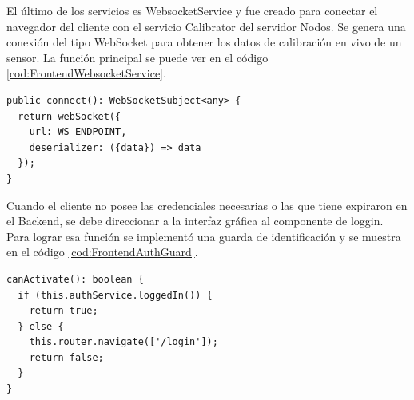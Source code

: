 El último de los servicios es WebsocketService y fue creado para conectar el navegador del cliente con el servicio Calibrator del servidor Nodos.
Se genera una conexión del tipo WebSocket para obtener los datos de calibración en vivo de un sensor.
La función principal se puede ver en el código \ref{cod:FrontendWebsocketService}.

\begin{lstlisting}[label=cod:FrontendWebsocketService,caption=Función principal de WebsocketService]
public connect(): WebSocketSubject<any> {
  return webSocket({
    url: WS_ENDPOINT,
    deserializer: ({data}) => data
  });
}
\end{lstlisting}

Cuando el cliente no posee las credenciales necesarias o las que tiene expiraron en el Backend, se debe direccionar a la interfaz gráfica al componente de loggin.
Para lograr esa función se implementó una guarda de identificación y se muestra en el código \ref{cod:FrontendAuthGuard}.

\begin{lstlisting}[label=cod:FrontendAuthGuard,caption=Función de guarda de identificación]
canActivate(): boolean {
  if (this.authService.loggedIn()) {
    return true;
  } else {
    this.router.navigate(['/login']);
    return false;
  }
}
\end{lstlisting}



